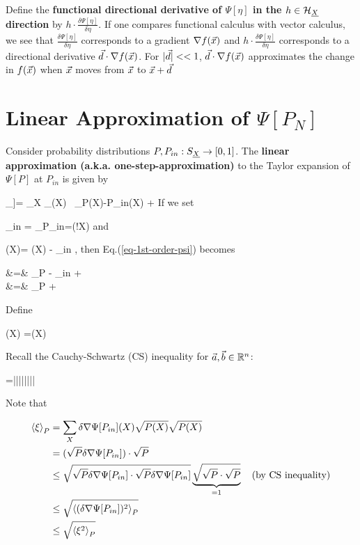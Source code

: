 Define the
{\bf functional directional derivative of $\Psi[\eta]$ in
the $h\in {\cal H}_{\underline{X}}$
direction}
by $h\cdot\frac{\delta \Psi[\eta]}{\delta \eta}$.
If one compares functional calculus with vector calculus, we see that
$\frac{\delta \Psi[\eta]}{\delta \eta}$ corresponds to a gradient
$\nabla f({\vec{x}})$ and
$h\cdot \frac{\delta \Psi[\eta]}{\delta \eta}$
corresponds to a directional derivative
${\vec{d}}\cdot \nabla f({\vec{x}})$.
For $|{\vec{d}}|<<1$, ${\vec{d}}\cdot \nabla f({\vec{x}})$ approximates
the change
in $f({\vec{x}})$ when ${\vec{x}}$ moves from ${\vec{x}}$ to ${\vec{x}}+{\vec{d}}$


\section{Linear Approximation of $\Psi[P_N]$}



Consider probability
distributions $P, P_{in}:S_{\underline{X}}\rightarrow [0,1]$.
The {\bf linear approximation (a.k.a.
one-step-approximation)}
to the Taylor expansion of $\Psi[P]$ at
$P_{in}$ is given by

\beq
\underbrace{\Psi[P] - \Psi[P_{in}]}_{\delta \Psi[P,P_{in}]}]=
\sum_X
_{\dpsi[P_{in}](X)}
\
_{P(X)-P_{in}(X)}
+
\calr[P, P_{in}]
\label{eq-1st-order-psi}
\eeq
If we set

\beq
\dpsi_{in} = \av{\dpsi[P_{in}]}_{P_{in}}=\caln(!X)\in\RR
\eeq
and

\beq
\delta\dpsi[P](X)= \dpsi[P](X) - \dpsi_{in}
\;,
\eeq
then Eq.(\ref{eq-1st-order-psi}) becomes

\beqa
\delta\Psi[P,P_{in}]&=&
\av{\dpsi[P_{in}]}_P - \dpsi_{in}
+
\calr[P, P_{in}]
\\
&=&
\av{\delta\dpsi[P_{in}]}_P
+
\calr[P, P_{in}]
\eeqa

Define

\beq
\xi(X) =\delta\dpsi[P_{in}](X)
\eeq

Recall the Cauchy-Schwartz (CS) inequality for $\vec{a}, \vec{b}\in{ \mathbb{R}}^n$:

\beq
{}\cdot{} =||||\cos\theta\leq ||||
\eeq

Note that

\begin{align}
\left\langle\xi\right\rangle_P
&=
 \sum_X\delta\nabla\Psi[P_{in}](X)\sqrt{P(X)}\sqrt{P(X)}
\\
&=
(\sqrt{P}\delta\nabla\Psi[P_{in}])\cdot\sqrt{P}
\\
&\leq
\sqrt{\sqrt{P}\delta\nabla\Psi[P_{in}]\cdot\sqrt{P}\delta\nabla\Psi[P_{in}]}
\underbrace{\sqrt{\sqrt{P}\cdot\sqrt{P}}}_{=1}
\quad \text{(by CS inequality)}
\\
&\leq
\sqrt{ \left\langle(\delta\nabla\Psi[P_{in}])^2\right\rangle_P
}
\\
&\leq
\sqrt{ \left\langle\xi^2\right\rangle_P
}
\end{align}


